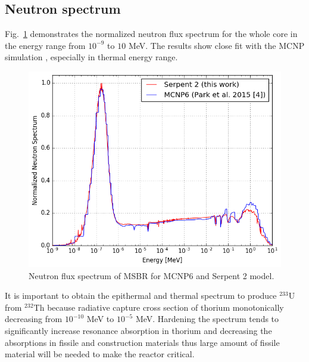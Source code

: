 \documentclass{anstrans}
\begin{document}
\subsection{Neutron spectrum}
Fig.~\ref{fig:spectrum} demonstrates the normalized neutron flux spectrum for the whole core in the energy range from $10^{-9}$ to $10$ MeV. The results show close fit with the MCNP simulation \cite{park_whole_2015}, especially in thermal energy range. 
\begin{figure}[h!] %
  \centering
  \includegraphics[width=1.05\linewidth]{figure_3_1.png} 
  \caption{Neutron flux spectrum of MSBR for MCNP6 and Serpent 2 model.}
  \label{fig:spectrum}
\end{figure}
It is important to obtain the epithermal and thermal spectrum to produce $^{233}$U from $^{232}$Th because radiative capture cross section of thorium monotonically decreasing from $10^{-10}$ MeV to $10^{-5}$ MeV. Hardening the spectrum tends to significantly increase resonance absorption in thorium and decreasing the absorptions in fissile and construction materials thus large amount of fissile material will be needed to make the reactor critical.
\end{document}
